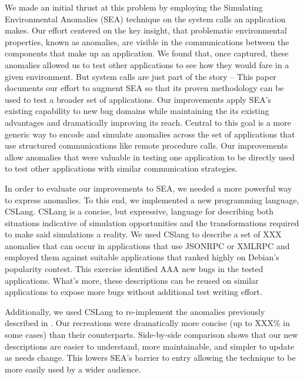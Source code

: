 We made an initial thrust at this problem by employing the
Simulating Environmental Anomalies (SEA) technique on the system calls an
application makes. Our effort centered on the key insight, that problematic
environmental properties, known as anomalies, are visible in the
communications between the components that make up an application.
We found that, once captured, these anomalies allowed us to test other
applications to see how they would fare in a given environment.
But system calls are just part of the story --
This paper documents our effort to augment SEA
so that its proven methodology
can be used to test a broader set of applications.
Our improvements
apply SEA's existing capability
to new bug domains
while maintaining the its existing advantages and
dramatically
improving its reach.
Central to this goal is
a more generic way to
encode and simulate anomalies across the set of applications that use
structured communications like remote procedure calls.
Our improvements allow anomalies that were
valuable in testing one application to be directly used to test other
applications with similar communication strategies.

In order to evaluate our improvements to SEA, we needed a more powerful
way to express anomalies.
To this end, we
implemented a new programming language, CSLang.  CSLang is a concise, but
expressive, language for describing both situations indicative of
simulation opportunities and the transformations required to make
said simulations a reality.
We used CSlang to describe a set of XXX anomalies that can occur in
applications that use JSONRPC or XMLRPC and employed them against
suitable
applications that ranked highly on Debian's popularity contest.  This
exercise identified AAA new bugs in the tested applications.
What's more, these descriptions can be reused on
similar applications to expose more
bugs without additional test writing effort.

Additionally, we used CSLang to re-implement the
anomalies previously described in .
Our recreations were dramatically more concise (up to XXX\% in some cases)
than their counterparts.  Side-by-side comparison shows that our new
descriptions are easier to understand, more maintainable, and simpler to
update as needs change.  This lowers SEA's barrier to entry allowing the
technique to be more easily used by a wider audience.


